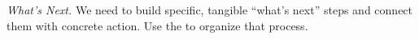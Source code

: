 \begin{refsection}

\begin{framed}
\noindent 
\emph{What's Next.}
We need to build specific, tangible ``what's next'' steps and connect them with concrete action. Use the  to organize that process. 
\end{framed}

\printbibliography[heading=subbibliography]
\end{refsection}
